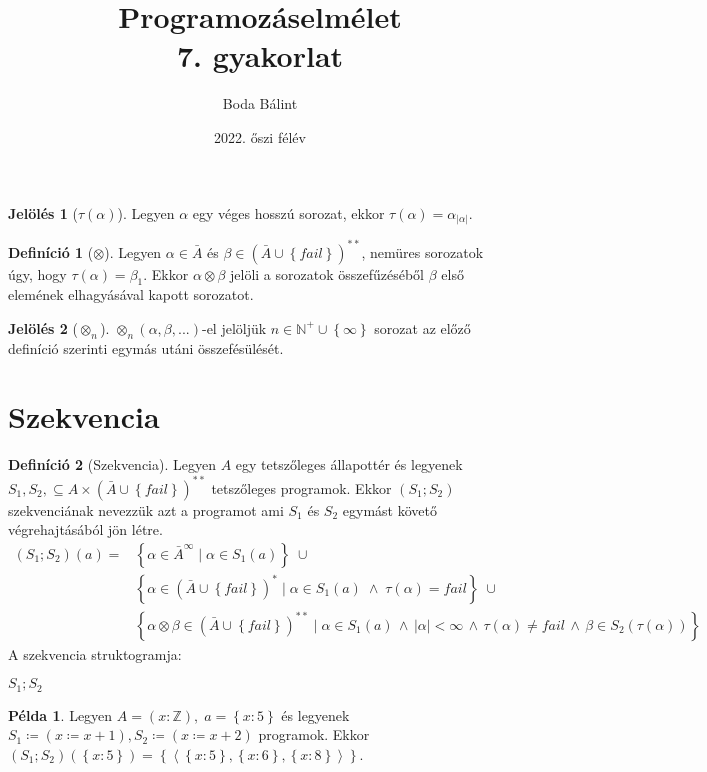 \documentclass[a4paper,12pt]{article}
\title{\huge{Programozáselmélet} \\ \large 7. gyakorlat}
\author{Boda Bálint}
\date{2022. őszi félév}
\theoremstyle{definition}
\newtheorem*{definition*}{Definíció}
\newtheorem*{notation*}{Jelölés}
\newtheorem*{example}{Példa}
\begin{document}
    \maketitle
    \begin{notation*}[$\tau(\alpha)$] Legyen $\alpha$ egy véges hosszú sorozat, ekkor $\tau(\alpha) = \alpha_{|\alpha|}$. \end{notation*}
    \begin{definition*}[$\otimes$] Legyen $\alpha \in \bar{A}$ és $\beta \in \left(\bar{A} \cup \left\{ fail \right\} \right)^{**} $, nemüres sorozatok úgy, hogy ${\tau(\alpha) = \beta_1}$. Ekkor $ \alpha \otimes \beta $ jelöli a sorozatok összefűzéséből $ \beta $ első elemének elhagyásával kapott sorozatot.
    \end{definition*}
   	\begin{notation*}[$\otimes_n$] $\otimes_n(\alpha, \beta, ...)$-el jelöljük $n \in \mathbb{N}^+ \cup \left\{\infty\right\} $ sorozat az előző definíció szerinti egymás utáni összefésülését.
    \end{notation*}
	\section{Szekvencia}
    \begin{definition*}[Szekvencia]
    	Legyen $A$ egy tetszőleges állapottér és legyenek $ S_1, S_2, \subseteq A \times \left(\bar{A} \cup \left\{ fail \right\} \right)^{**}$ tetszőleges programok. Ekkor $(S_1;S_2)$ szekvenciának nevezzük azt a programot ami $S_1$ és $S_2$ egymást követő végrehajtásából jön létre.
    	\begin{align*}
    		(S_1;S_2)(a) =& \left\lbrace \alpha \in \bar{A}^{\infty} \; | \; \alpha \in S_1(a) \right\rbrace \; \cup \\
    		& \left\lbrace \alpha \in \left(\bar{A} \cup \left\{ fail \right\} \right)^{*} \; | \; \alpha \in S_1(a) \; \land \; \tau(\alpha) = fail \right\rbrace \; \cup \\
    		& \left\lbrace \alpha \otimes \beta \in \left(\bar{A} \cup \left\{ fail \right\} \right)^{**} \; | \; \alpha \in S_1(a) \, \land \, |\alpha| < \infty \, \land \, \tau(\alpha) \ne fail \, \land \, \beta \in S_2(\tau(\alpha)) \right\rbrace
    	\end{align*}
    A szekvencia struktogramja:
    \begin{stuki*}[3cm]{$ S_1;S_2 $}
    \end{stuki*}
    \end{definition*}
	\begin{example}
		Legyen $A = (x:\mathbb{Z}),\; a = \left\lbrace x:5 \right\rbrace $ és legyenek $S_1 \coloneq (x \coloneq x + 1), S_2 \coloneq (x \coloneq x + 2) $ programok. Ekkor $ (S_1;S_2)(\left\lbrace x:5 \right\rbrace) = \left\lbrace \left\langle  \left\lbrace x:5 \right\rbrace , \left\lbrace x:6 \right\rbrace, \left\lbrace x:8 \right\rbrace \right\rangle \right\rbrace $.
	\end{example}
\end{document}
